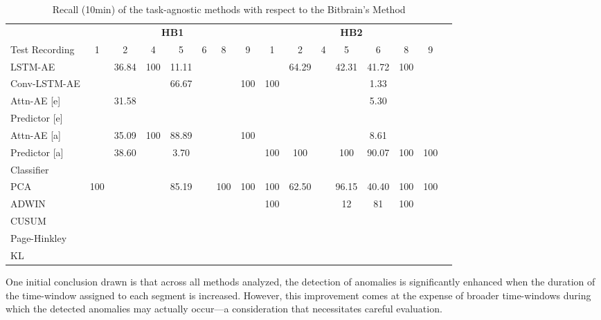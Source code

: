 \begin{table}[btp]
\centering
 \caption{Recall (10min) of the task-agnostic methods with respect to the Bitbrain's Method}
\label{tab6}

\begin{tabular}{lccccccccccccccc}
\toprule
          & \multicolumn{7}{c}{\textbf{HB1}} & \multicolumn{7}{c}{\textbf{HB2}} \\
\cmidrule(lr){2-8}\cmidrule(lr){9-15}
Test Recording & 1 & 2 & 4 & 5 & 6 & 8 & 9 & 1 & 2 & 4 & 5 & 6 & 8 & 9 \\
\cmidrule(lr){2-8}\cmidrule(lr){9-15}
LSTM-AE	&		&	36.84	&	100	&	11.11	&		&		&		&		&	64.29	&		&	42.31	&	41.72	&	100	&		\\
Conv-LSTM-AE	&		&		&		&	66.67	&		&		&	100	&	100	&		&		&		&	1.33	&		&		\\
\midrule
Attn-AE [e]	&		&	31.58	&		&		&		&		&		&		&		&		&		&	5.30	&		&		\\
Predictor [e]	&		&		&		&		&		&		&		&		&		&		&		&		&		&		\\
\midrule
Attn-AE [a]	&		&	35.09	&	100	&	88.89	&		&		&	100	&		&		&		&		&	8.61	&		&		\\
Predictor [a]	&		&	38.60	&		&	3.70	&		&		&		&	100	&	100	&		&	100	&	90.07	&	100	&	100	\\
Classifier  &&     &       &       &       &       &       &       &       &       &       &       &       &         \\
\midrule
PCA	&	100	&		&		&	85.19	&		&	100	&	100	&	100	&	62.50	&		&	96.15	&	40.40	&	100	&	100	\\
ADWIN      &   &     &   &    &      &  &       & 100  &   &       & 12  &  81  &  100  &         \\
CUSUM      &   &     &       &    &       &    &       &  &    &       &   &  &   &         \\
Page-Hinkley      &   &     &       &    &       &    &       &   &    &       &  &  &    &         \\
KL      &   &     &       &    &       &    &       &   &   &       &  &  &    &         \\
\bottomrule
\end{tabular}

\end{table}

One initial conclusion drawn is that across all methods analyzed, the detection of anomalies is significantly enhanced when the duration of the time-window assigned to each segment is increased. However, this improvement comes at the expense of broader time-windows during which the detected anomalies may actually occur---a consideration that necessitates careful evaluation.

